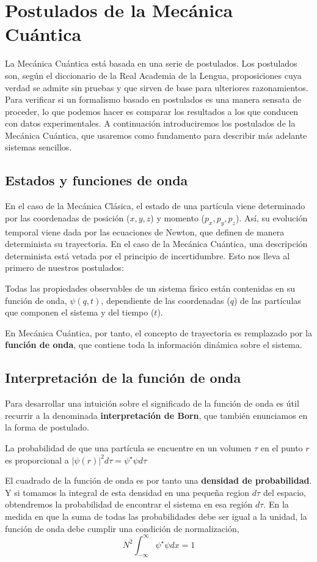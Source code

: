 \chapter{Postulados de la Mecánica Cuántica}
La Mecánica Cuántica está basada en una serie de
postulados. Los postulados son, según el diccionario
de la Real Academia de la Lengua, proposiciones cuya
verdad se admite sin pruebas y que sirven de base para
ulteriores razonamientos. Para verificar si un formalismo
basado en postulados es una manera sensata de proceder, 
lo que podemos hacer es comparar los resultados a los 
que conducen con datos experimentales.
A continuación introduciremos
los postulados de la Mecánica Cuántica, que usaremos 
como fundamento para describir más adelante sistemas
sencillos.

\section*{Estados y funciones de onda}
En el caso de la Mecánica Clásica, el estado de una partícula
viene determinado por las  coordenadas de posición ($x, y, z$) 
y momento ($p_x, p_y, p_z$). Así, su evolución temporal viene
dada por las ecuaciones de Newton, que definen de manera 
determinista su trayectoria. En el caso de la Mecánica Cuántica,
una descripción determinista está vetada por el principio de
incertidumbre. Esto nos lleva al primero de nuestros 
postulados:

\begin{theorem}
Todas las propiedades observables de un sistema físico 
están contenidas en su función de onda, $\psi(q,t)$,
dependiente de las coordenadas ($q$) de las
partículas que componen el sistema y del tiempo ($t$). 
\end{theorem}

En Mecánica Cuántica, por tanto, el concepto de 
trayectoria es remplazado por la \textbf{función de
onda}, que contiene toda la información dinámica 
sobre el sistema.

\section{Interpretación de la función de onda}
Para desarrollar una intuición sobre el significado
de la función de onda es útil recurrir a la 
denominada \textbf{interpretación de 
Born}, que también enunciamos en la forma de 
postulado.
\begin{theorem} 
La probabilidad de que una partícula se encuentre en 
un volumen $\tau$ en el punto $r$ es proporcional
a $|\psi(r)|^2d\tau=\psi^\star \psi d\tau$
\end{theorem}
El cuadrado de la función de onda es por tanto una
\textbf{densidad de probabilidad}. Y si tomamos la
integral de esta densidad en una pequeña region 
$d\tau$ del espacio, obtendremos la probabilidad de
encontrar el sistema en esa región $d\tau$. En la 
medida en que la suma de todas las probabilidades
debe ser igual a la unidad, la función de onda debe 
cumplir una condición de normalización,
\begin{equation}
    N^2\int_{-\infty}^\infty\psi^\star\psi dx=1
    \label{eq:norm}
\end{equation}

